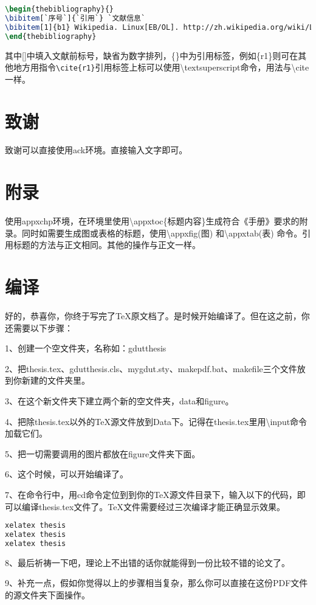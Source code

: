\begin{lstlisting}[language=TeX]
\begin{thebibliography}{}
\bibitem[`序号`]{`引用`} `文献信息`
\bibitem[1]{b1} Wikipedia. Linux[EB/OL]. http://zh.wikipedia.org/wiki/Linux,2013-5-20/2013-5-26. 
\end{thebibliography}
\end{lstlisting}

其中[]中填入文献前标号，缺省为数字排列，\{\}中为引用标签，例如\{r1\}则可在其他地方用指令\verb|\cite{r1}|引用标签上标可以使用\textbackslash textsuperscript命令，用法与\textbackslash cite一样。

\section{致谢}
致谢可以直接使用ack环境。直接输入文字即可。

\section{附录}
使用appxchp环境，在环境里使用\textbackslash appxtoc\{标题内容\}生成符合《手册》要求的附录。同时如需要生成图或表格的标题，使用\textbackslash appxfig(图) 和\textbackslash appxtab(表) 命令。引用标题的方法与正文相同。其他的操作与正文一样。

\section{编译}
\label{sec:compile}
好的，恭喜你，你终于写完了\TeX{}原文档了。是时候开始编译了。但在这之前，你还需要以下步骤：

1、创建一个空文件夹，名称如：gdutthesis

2、把thesis.tex、gdutthesis.cls、mygdut.sty、makepdf.bat、makefile三个文件放到你新建的文件夹里。

3、在这个新文件夹下建立两个新的空文件夹，data和figure。

4、把除thesis.tex以外的\TeX{}源文件放到Data下。记得在thesis.tex里用\textbackslash input命令加载它们。

5、把一切需要调用的图片都放在figure文件夹下面。

6、这个时候，可以开始编译了。

7、在命令行中，用cd命令定位到到你的\TeX{}源文件目录下，输入以下的代码，即可以编译thesis.tex文件了。\TeX{}文件需要经过三次编译才能正确显示效果\textsuperscript{\cite{shouce}}。 

\begin{lstlisting}[language=TeX]
xelatex thesis
xelatex thesis
xelatex thesis
\end{lstlisting}

8、最后祈祷一下吧，理论上不出错的话你就能得到一份比较不错的论文了。

9、补充一点，假如你觉得以上的步骤相当复杂，那么你可以直接在这份PDF文件的源文件夹下面操作。
